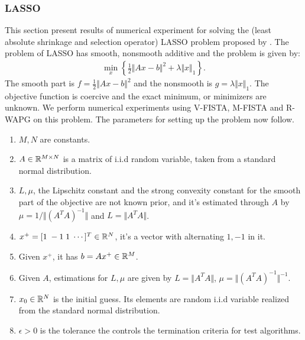 \documentclass[12pt]{article}
\begin{document}
    \subsubsection{LASSO}
        This section present results of numerical experiment for solving the (least absolute shrinkage and
        selection operator) LASSO problem proposed by 
         \cite{tibshirani_regression_1996}. 
        The problem of LASSO has smooth, nonsmooth additive and the problem is given by: 
        \begin{align*}
            \min_x
            \left\lbrace
                \frac{1}{2}\Vert Ax - b\Vert^2 + \lambda\Vert x\Vert_1
            \right\rbrace. 
        \end{align*}
        The smooth part is $f =\frac{1}{2}\Vert Ax - b\Vert^2$ and the nonsmooth is $g = \lambda\Vert x\Vert_1$. 
        The objective function is coercive and the exact minimum, or minimizers are unknown. 
        We perform numerical experiments using V-FISTA, M-FISTA and R-WAPG on this problem. 
        The parameters for setting up the problem now follow. 
        \begin{enumerate}
            \item $M, N$ are constants. 
            \item $A \in \mathbb R^{M\times N}$ is a matrix of i.i.d random variable, taken from a standard normal distribution. 
            \item $L, \mu$, the Lipschitz constant and the strong convexity constant for the smooth part of the objective are not known prior, and it's estimated through $A$ by $\mu = 1/\Vert (A^TA)^{-1}\Vert$ and $L = \Vert A^TA\Vert$. 
            \item $x^+ = [1\; -1\; 1 \; \cdots ]^T \in \mathbb R^N$, it's a vector with alternating $1, -1$ in it. 
            \item Given $x^+$, it has $b = Ax^+ \in \mathbb R^M$. 
            \item Given $A$, estimations for $L,\mu$ are given by $L = \Vert A^TA\Vert$, $\mu = \Vert (A^TA)^{-1}\Vert^{-1}$. 
            \item $x_0\in \mathbb R^N$ is the initial guess. Its elements are random i.i.d variable realized from the standard normal distribution. 
            \item $\epsilon > 0$ is the tolerance the controls the termination criteria for test algorithms. 
        \end{enumerate}
\end{document}
